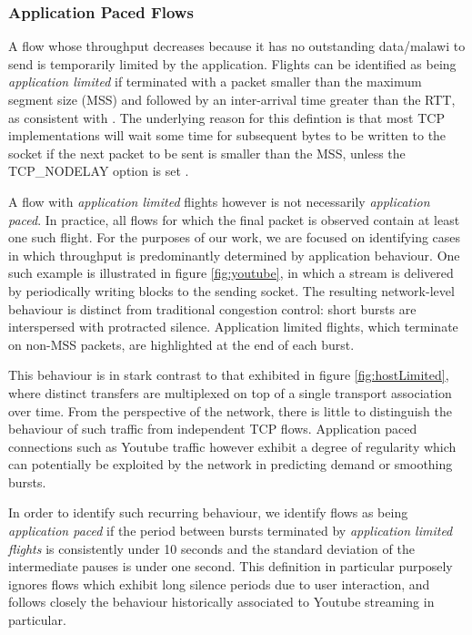 \subsubsection{Application Paced Flows}
\label{sssec:app}

A flow whose throughput decreases because it has no outstanding data/malawi to send is temporarily limited by the application. 
Flights can be identified as being \emph{application limited} if terminated with a packet smaller than the maximum segment size (MSS) and followed by an inter-arrival time greater than the RTT, as consistent with \cite{Zhang:2002p85}. The underlying reason for this defintion is that most TCP implementations will wait some time for subsequent bytes to be written to the socket if the next packet to be sent is smaller than the MSS, unless the TCP\_NODELAY option is set \cite{nagle1984rfc}.

A flow with \emph{application limited} flights however is not necessarily \emph{application paced}. In practice, all flows for which the final packet is observed contain at least one such flight.
For the purposes of our work, we are focused on identifying cases in which throughput is predominantly determined by application behaviour.
One such example is illustrated in figure \ref{fig:youtube}, in which a stream is delivered by periodically writing blocks to the sending socket.
The resulting network-level behaviour is distinct from traditional congestion control: short bursts are interspersed with protracted silence.
Application limited flights, which terminate on non-MSS packets, are highlighted at the end of each burst.

This behaviour is in stark contrast to that exhibited in figure \ref{fig:hostLimited}, where distinct transfers are multiplexed on top of a single transport association over time.
From the perspective of the network, there is little to distinguish the behaviour of such traffic from independent TCP flows.
Application paced connections such as Youtube traffic however exhibit a degree of regularity which can potentially be exploited by the network in predicting demand or smoothing bursts.

In order to identify such recurring behaviour, we identify flows as being \emph{application paced} if the period between bursts terminated by \emph{application limited flights} is consistently under 10 seconds and the standard deviation of the intermediate pauses is under one second.
This definition in particular purposely ignores flows which exhibit long silence periods due to user interaction, and follows closely the behaviour historically associated to Youtube streaming in particular.

